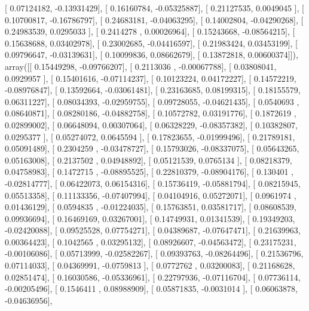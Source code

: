 \documentclass{article}
\begin{document}
       [ 0.07124182, -0.13931429],
       [ 0.16160784, -0.05325887],
       [ 0.21127535,  0.0049045 ],
       [ 0.10700817, -0.16786797],
       [ 0.24683181, -0.04063295],
       [ 0.14002804, -0.04290268],
       [ 0.24983539,  0.0295033 ],
       [ 0.2414278 ,  0.00026964],
       [ 0.15243668, -0.08564215],
       [ 0.15638688,  0.03402978],
       [ 0.23002685, -0.04416597],
       [ 0.21983424,  0.03453199],
       [ 0.09796647, -0.03139631],
       [ 0.10099836,  0.08662679],
       [ 0.13872818,  0.00600374]]), array([[ 0.15449298, -0.09766207],
       [ 0.2113036 , -0.00067788],
       [ 0.03808041,  0.0929957 ],
       [ 0.15401616, -0.07114237],
       [ 0.10123224,  0.04172227],
       [ 0.14572219, -0.08976847],
       [ 0.13592664, -0.03061481],
       [ 0.23163685,  0.08199315],
       [ 0.18155579,  0.06311227],
       [ 0.08034393, -0.02959755],
       [ 0.09728055, -0.04621435],
       [ 0.0540693 ,  0.08640871],
       [ 0.08280186, -0.04882758],
       [ 0.10572782,  0.03191776],
       [ 0.1872619 ,  0.02899002],
       [ 0.06648094,  0.00307064],
       [ 0.06328229, -0.08357382],
       [ 0.10382807,  0.0295377 ],
       [ 0.05274072,  0.0645594 ],
       [ 0.17823655, -0.01999496],
       [ 0.21789181,  0.05091489],
       [ 0.2304259 , -0.03478727],
       [ 0.15793026, -0.08337075],
       [ 0.05643265,  0.05163008],
       [ 0.2137502 ,  0.04948892],
       [ 0.05121539,  0.0765134 ],
       [ 0.08218379,  0.04758983],
       [ 0.1472715 , -0.08895525],
       [ 0.22810379, -0.08904176],
       [ 0.130401  , -0.02814777],
       [ 0.06422073,  0.06154316],
       [ 0.15736419, -0.05881794],
       [ 0.08215945,  0.05513358],
       [ 0.11133356, -0.07407994],
       [ 0.04104916,  0.05272071],
       [ 0.0961974 ,  0.01436129],
       [ 0.0594835 , -0.01224035],
       [ 0.15763851,  0.03581717],
       [ 0.08608539,  0.09936694],
       [ 0.16469169,  0.03267001],
       [ 0.14749931,  0.01341539],
       [ 0.19349203, -0.02420088],
       [ 0.09525528,  0.07754271],
       [ 0.04389687, -0.07647471],
       [ 0.21639963,  0.00364423],
       [ 0.1042565 ,  0.03295132],
       [ 0.08926607, -0.04563472],
       [ 0.23175231, -0.00106086],
       [ 0.05713999, -0.02582267],
       [ 0.09393763, -0.08264496],
       [ 0.21536796,  0.07114033],
       [ 0.04369991, -0.0759813 ],
       [ 0.0772762 ,  0.03200083],
       [ 0.21168628,  0.02851474],
       [ 0.16030586, -0.05336961],
       [ 0.22797936, -0.07116704],
       [ 0.07736114, -0.00205496],
       [ 0.1546411 ,  0.08988909],
       [ 0.05871835, -0.0031014 ],
       [ 0.06063878, -0.04636956],
\end{document}
